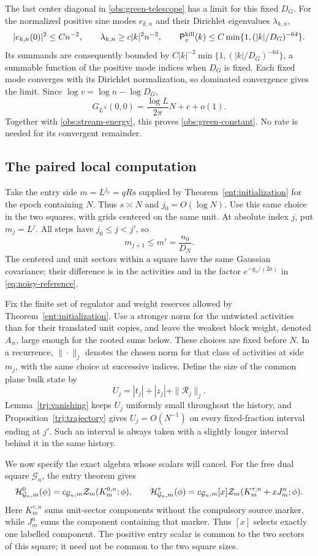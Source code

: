 The last center diagonal in \eqref{obs:green-telescope} has a limit
for this fixed \(D_G\).  For the normalized positive sine modes
\(e_{k,n}\) and their Dirichlet eigenvalues \(\lambda_{k,n}\),
\[
 |e_{k,n}(0)|^2\le Cn^{-2},\qquad
 \lambda_{k,n}\ge c|k|^2n^{-2},\qquad
 \mathsf P_v^{\rm kill}(k)
       \le C\min\{1,(|k|/D_G)^{-64}\}.
\]
Its summands are consequently bounded by
\(C|k|^{-2}\min\{1,(|k|/D_G)^{-64}\}\), a summable function of the
positive mode indices when \(D_G\) is fixed.  Each fixed mode
converges with its Dirichlet normalization, so dominated convergence
gives the limit.  Since \(\log v=\log n-\log D_G\),
\[
 G_{L^N}(0,0)=\frac{\log L}{2\pi}N+c+o(1).
\]
Together with \eqref{obs:stream-energy}, this proves
\eqref{obs:green-constant}.  No rate is needed for its convergent
remainder.

\subsection{The paired local computation}

Take the entry side \(m=L^{j_0}=qRs\) supplied by
Theorem~\ref{ent:initialization} for the epoch containing \(N\).
Thus \(s\asymp N\) and \(j_0=O(\log N)\).  Use this same choice in
the two squares, with grids centered on the same unit.  At absolute
index \(j\), put \(m_j=L^j\).  All steps have \(j_0\le j<j'\), so
\[
                    m_{j+1}\le m'=\frac{n_0}{D_N}.
\]
The centered and unit sectors within a square have the same Gaussian
covariance; their difference is in the activities and in the factor
\(e^{-g_n/(2a)}\) in \eqref{eq:noisy-reference}.

Fix the finite set of regulator and weight reserves allowed by
Theorem~\ref{ent:initialization}.  Use a stronger norm for the
untwisted activities than for their translated unit copies, and
leave the weakest block weight, denoted \(A_w\), large enough for the
rooted sums below.  These choices are fixed before \(N\).  In a
recurrence, \(\|\cdot\|_j\) denotes the chosen norm for that class of
activities at side \(m_j\), with the same choice at successive
indices.  Define the size of the common plane bulk state by
\[
          U_j=|t_j|+|z_j|+\|\mathcal R_j\|_j.
\]
Lemma~\ref{trj:vanishing} keeps \(U_j\) uniformly small throughout
the history, and Proposition~\ref{trj:trajectory} gives \(U_j=O(N^{-1})\)
on every fixed-fraction interval ending at \(j'\).  Such an interval
is always taken with a slightly longer interval behind it in the
same history.

We now specify the exact algebra whose scalars will cancel.
For the free dual square \(\mathcal G_n\), the entry theorem gives
\[
 \mathcal H_{\mathcal G_n,m}^0(\phi)
       =c_{\mathcal G_n,m}\mathcal Z_m(K_m^{0,n};\phi),\qquad
 \mathcal H_{\mathcal G_n,m}^\tau(\phi)
       =c_{\mathcal G_n,m}[x]\mathcal Z_m(K_m^{\tau,n}+xJ_m^n;\phi).
\]
Here \(K_m^{\tau,n}\) sums unit-sector components without the
compulsory source marker, while \(J_m^n\) sums the component containing
that marker.  Thus \([x]\) selects exactly one labelled component.
The positive entry scalar is common to the two sectors of this
square; it need not be common to the two square sizes.


